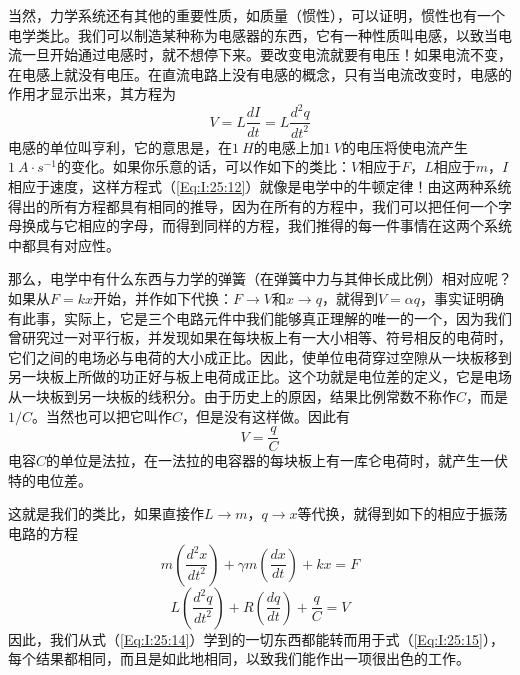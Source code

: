 当然，力学系统还有其他的重要性质，如质量（惯性），可以证明，惯性也有一个电学类比。我们可以制造某种称为电感器的东西，它有一种性质叫电感，以致当电流一旦开始通过电感时，就不想停下来。要改变电流就要有电压！如果电流不变，在电感上就没有电压。在直流电路上没有电感的概念，只有当电流改变时，电感的作用才显示出来，其方程为
\begin{equation}
    \label{Eq:I:25:12}
    V=L\frac{dI}{dt}=L\frac{d^2q}{dt^2}
\end{equation}
电感的单位叫亨利，它的意思是，在$1~H$的电感上加$1~V$的电压将使电流产生$1~A\cdot s^{-1}$的变化。如果你乐意的话，可以作如下的类比：$V$相应于$F$，$L$相应于$m$，$I$相应于速度，这样方程式（\ref{Eq:I:25:12}）就像是电学中的牛顿定律！由这两种系统得出的所有方程都具有相同的推导，因为在所有的方程中，我们可以把任何一个字母换成与它相应的字母，而得到同样的方程，我们推得的每一件事情在这两个系统中都具有对应性。

那么，电学中有什么东西与力学的弹簧（在弹簧中力与其伸长成比例）相对应呢？如果从$F=kx$开始，并作如下代换：$F\to V$和$x\to q$，就得到$V=\alpha q$，事实证明确有此事，实际上，它是三个电路元件中我们能够真正理解的唯一的一个，因为我们曾研究过一对平行板，并发现如果在每块板上有一大小相等、符号相反的电荷时，它们之间的电场必与电荷的大小成正比。因此，使单位电荷穿过空隙从一块板移到另一块板上所做的功正好与板上电荷成正比。这个功就是电位差的定义，它是电场从一块板到另一块板的线积分。由于历史上的原因，结果比例常数不称作$C$，而是$1/C$。当然也可以把它叫作$C$，但是没有这样做。因此有
\begin{equation}
    \label{Eq:I:25:13}
    V=\frac{q}{C}
\end{equation}
电容$C$的单位是法拉，在一法拉的电容器的每块板上有一库仑电荷时，就产生一伏特的电位差。

这就是我们的类比，如果直接作$L\to m$，$q\to x$等代换，就得到如下的相应于振荡电路的方程
\begin{equation}
    \label{Eq:I:25:14}
    m\left ( \frac{d^2x}{dt^2} \right ) + \gamma m\left ( \frac{dx}{dt} \right ) + kx = F
\end{equation}
\begin{equation}
    \label{Eq:I:25:15}
    L\left ( \frac{d^2q}{dt^2} \right ) + R \left ( \frac{dq}{dt} \right ) + \frac{q}{C} = V
\end{equation}
因此，我们从式（\ref{Eq:I:25:14}）学到的一切东西都能转而用于式（\ref{Eq:I:25:15}），每个结果都相同，而且是如此地相同，以致我们能作出一项很出色的工作。

